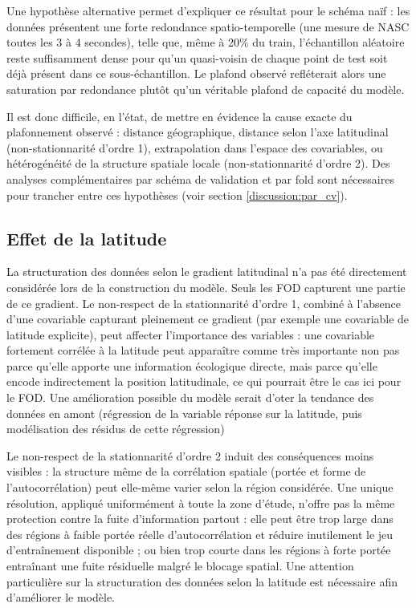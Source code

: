 \documentclass[11pt,a4paper,oneside]{report}
\begin{document}
	Une hypothèse alternative permet d'expliquer ce résultat pour le schéma naïf : les données présentent une forte redondance spatio-temporelle (une mesure de NASC toutes les 3 à 4 secondes), telle que, même à 20\% du train, l'échantillon aléatoire reste suffisamment dense pour qu'un quasi-voisin de chaque point de test soit déjà présent dans ce sous-échantillon. Le plafond observé refléterait alors une saturation par redondance plutôt qu'un véritable plafond de capacité du modèle.
	
	Il est donc difficile, en l'état, de mettre en évidence la cause exacte du plafonnement observé : distance géographique, distance selon l'axe latitudinal (non-stationnarité d'ordre 1), extrapolation dans l'espace des covariables, ou hétérogénéité de la structure spatiale locale (non-stationnarité d'ordre 2). Des analyses complémentaires par schéma de validation et par fold sont nécessaires pour trancher entre ces hypothèses (voir section \ref{discussion:par_cv}).
	
	\subsection{Effet de la latitude}
	\label{discussion:lat_effect}
	La structuration des données selon le gradient latitudinal n'a pas été directement considérée lors de la construction du modèle. Seuls les FOD capturent une partie de ce gradient. Le non-respect de la stationnarité d'ordre 1, combiné à l'absence d'une covariable capturant pleinement ce gradient (par exemple une covariable de latitude explicite), peut affecter l'importance des variables : une covariable fortement corrélée à la latitude peut apparaître comme très importante non pas parce qu'elle apporte une information écologique directe, mais parce qu'elle encode indirectement la position latitudinale, ce qui pourrait être le cas ici pour le FOD. Une amélioration possible du modèle serait d'oter la tendance des données en amont (régression de la variable réponse sur la latitude, puis modélisation des résidus de cette régression)
	
	Le non-respect de la stationnarité d'ordre 2 induit des conséquences moins visibles : la structure même de la corrélation spatiale (portée et forme de l'autocorrélation) peut elle-même varier selon la région considérée. Une unique résolution, appliqué uniformément à toute la zone d'étude, n'offre pas la même protection contre la fuite d'information partout : elle peut être trop large dans des régions à faible portée réelle d'autocorrélation et réduire inutilement le jeu d'entraînement disponible ; ou bien trop courte dans les régions à forte portée entraînant une fuite résiduelle malgré le blocage spatial. 
	Une attention particulière sur la structuration des données selon la latitude est nécessaire afin d'améliorer le modèle. 
	
\end{document}
